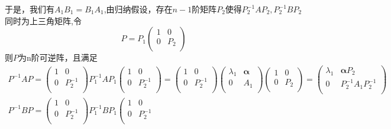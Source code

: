 \documentclass[lang=cn,10pt]{elegantbook}
\begin{document}
于是，我们有$A_{1}B_{1}=B_{1}A_{1}$,由归纳假设，存在$n-1$阶矩阵$P_{2}$使得$P_{2}^{-1}AP_{2},P_{2}^{-1}BP_{2}$同时为上三角矩阵,令
\begin{equation*}
	P=P_1\left( \begin{matrix}
		1&		0\\
		0&		P_2\\
	\end{matrix} \right) 
\end{equation*}
则$P$为n阶可逆阵，且满足
\begin{equation*}
	\begin{split}
		P^{-1}AP=\left( \begin{matrix}
			1&		0\\
			0&		P_{2}^{-1}\\
		\end{matrix} \right) P_{1}^{-1}AP_{1}^{}\left( \begin{matrix}
			1&		0\\
			0&		P_{2}^{-1}\\
		\end{matrix} \right) =\left( \begin{matrix}
			1&		0\\
			0&		P_{2}^{-1}\\
		\end{matrix} \right) \left( \begin{matrix}
			\lambda _1&		\boldsymbol{\alpha }\\
			0&		A_1\\
		\end{matrix} \right) \left( \begin{matrix}
			1&		0\\
			0&		P_{2}^{}\\
		\end{matrix} \right) =\left( \begin{matrix}
			\lambda _1&		\boldsymbol{\alpha }P_2\\
			0&		P_{2}^{-1}A_1P_{2}^{-1}\\
		\end{matrix} \right) 
		\\
		P^{-1}BP=\left( \begin{matrix}
			1&		0\\
			0&		P_{2}^{-1}\\
		\end{matrix} \right) P_{1}^{-1}BP_{1}^{}\left( \begin{matrix}
			1&		0\\
			0&		P_{2}^{-1}\\

\end{matrix}
\end{split}
\end{equation*}
\end{document}
